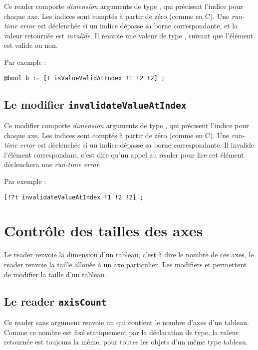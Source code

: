 Ce reader comporte \emph{dimension} arguments de type , qui précisent l'indice pour chaque axe. Les indices sont comptés à partir de zéro (comme en C). Une \emph{run-time error} est déclenchée si un indice dépasse sa borne correspondante, et la valeur retournée est \emph{invalide}. Il renvoie une valeur de type , suivant que l'élément est valide ou non.

Par exemple :
\begin{lstlisting}[language=galgas]
  @bool b := [t isValueValidAtIndex !1 !2 !2] ;
\end{lstlisting}


\subsection{Le modifier \texttt{invalidateValueAtIndex}}

Ce modifier comporte \emph{dimension} arguments de type , qui précisent l'indice pour chaque axe. Les indices sont comptés à partir de zéro (comme en C). Une \emph{run-time error} est déclenchée si un indice dépasse sa borne correspondante. Il invalide l'élément correspondant, c'est dire qu'un appel au reader  pour lire cet élément déclenchera une \emph{run-time error}.

Par exemple :
\begin{lstlisting}[language=galgas]
  [!?t invalidateValueAtIndex !1 !2 !2] ;
\end{lstlisting}





\section{Contrôle des tailles des axes}

Le reader  renvoie la dimension d'un tableau, c'est à dire le nombre de ces axes, le reader  renvoie la taille allouée à un axe particulier. Les modifiers  et  permettent de modifier la taille d'un tableau.



\subsection{Le reader \texttt{axisCount}}

Ce reader sans argument renvoie un  qui contient le nombre d'axes d'un tableau. Comme ce nombre est fixé statiquement par la déclaration de type, la valeur retournée est toujours la même, pour toutes les objets d'un même type tableau.


